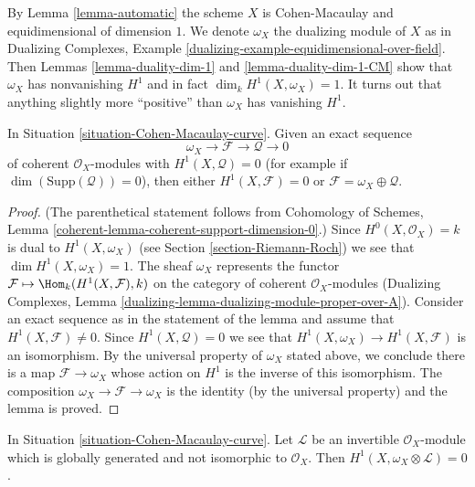 \noindent
By Lemma \ref{lemma-automatic} the scheme $X$ is Cohen-Macaulay and
equidimensional of dimension $1$. We denote $\omega_X$ the dualizing module
of $X$ as in Dualizing Complexes, Example
\ref{dualizing-example-equidimensional-over-field}.
Then Lemmas \ref{lemma-duality-dim-1} and \ref{lemma-duality-dim-1-CM}
show that $\omega_X$ has nonvanishing $H^1$ and in fact
$\dim_k H^1(X, \omega_X) = 1$. It turns out
that anything slightly more ``positive'' than $\omega_X$ has vanishing $H^1$.

\begin{lemma}
\label{lemma-vanishing}
In Situation \ref{situation-Cohen-Macaulay-curve}. Given an exact sequence
$$
\omega_X \to \mathcal{F} \to \mathcal{Q} \to 0
$$
of coherent $\mathcal{O}_X$-modules with $H^1(X, \mathcal{Q}) = 0$
(for example if $\dim(\text{Supp}(\mathcal{Q})) = 0$), then
either $H^1(X, \mathcal{F}) = 0$ or
$\mathcal{F} = \omega_X \oplus \mathcal{Q}$.
\end{lemma}

\begin{proof}
(The parenthetical statement follows from
Cohomology of Schemes, Lemma \ref{coherent-lemma-coherent-support-dimension-0}.)
Since $H^0(X, \mathcal{O}_X) = k$ is dual to $H^1(X, \omega_X)$
(see Section \ref{section-Riemann-Roch})
we see that $\dim H^1(X, \omega_X) = 1$. The sheaf $\omega_X$
represents the functor
$\mathcal{F} \mapsto \Hom_k(H^1(X, \mathcal{F}), k)$
on the category of coherent $\mathcal{O}_X$-modules
(Dualizing Complexes, Lemma
\ref{dualizing-lemma-dualizing-module-proper-over-A}).
Consider an exact sequence as in the statement of the lemma
and assume that $H^1(X, \mathcal{F}) \not = 0$. Since
$H^1(X, \mathcal{Q}) = 0$ we see that
$H^1(X, \omega_X) \to H^1(X, \mathcal{F})$ is an isomorphism.
By the universal property of $\omega_X$ stated above, we conclude there
is a map $\mathcal{F} \to \omega_X$ whose action on $H^1$ is the inverse
of this isomorphism. The composition $\omega_X \to \mathcal{F} \to \omega_X$
is the identity (by the universal property) and the lemma is proved.
\end{proof}

\begin{lemma}
\label{lemma-vanishing-twist}
In Situation \ref{situation-Cohen-Macaulay-curve}. Let
$\mathcal{L}$ be an invertible $\mathcal{O}_X$-module which is
globally generated and not isomorphic to $\mathcal{O}_X$. Then
$H^1(X, \omega_X \otimes \mathcal{L}) = 0$.
\end{lemma}

